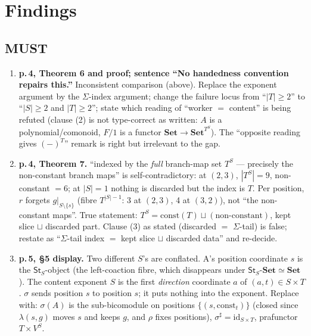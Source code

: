 \documentclass[11pt]{article}
\newcommand{\St}{\mathsf{St}}
\begin{document}
\section*{Findings}
\subsection*{MUST}
\begin{enumerate}[label=\textbf{M\arabic*.},leftmargin=*]
\item \textbf{p.\,4, Theorem 6 and proof; sentence ``No handedness convention repairs this.''}
  Inconsistent comparison (above). Replace the exponent argument by the $\Sigma$-index argument; change
  the failure locus from ``$|T|\ge2$'' to ``$|S|\ge2$ and $|T|\ge2$''; state which reading of
  ``worker $=$ content'' is being refuted (clause (2) is not type-correct as written: $A$ is a
  polynomial/comonoid, $F/1$ is a functor $\mathbf{Set}\to\mathbf{Set}^{T^S}$). The ``opposite reading
  gives $(-)^T$'' remark is right but irrelevant to the gap.
\item \textbf{p.\,4, Theorem 7.} ``indexed by the \emph{full} branch-map set $T^S$ --- precisely the
  non-constant branch maps'' is self-contradictory: at $(2,3)$, $|T^S|=9$, non-constant $=6$; at
  $|S|=1$ nothing is discarded but the index is $T$. Per position, $r$ forgets $g|_{S\setminus\{s\}}$
  (fibre $T^{|S|-1}$: 3 at $(2,3)$, 4 at $(3,2)$), not ``the non-constant maps''. True statement:
  $T^S=\mathrm{const}(T)\sqcup(\text{non-constant})$, kept slice $\sqcup$ discarded part. Clause (3)
  as stated (discarded $=$ $\Sigma$-tail) is false; restate as ``$\Sigma$-tail index $=$ kept slice $\sqcup$ discarded
  data'' and re-decide.
\item \textbf{p.\,5, \S5 display.} Two different $S$'s are conflated. A's position coordinate
  $s$ is the $\St_S$-object (the left-coaction fibre, which disappears under
  $\St_S\text{-}\mathbf{Set}\simeq\mathbf{Set}$). The content exponent $S$ is the first
  \emph{direction} coordinate $a$ of $(a,t)\in S\times T$. $\sigma$ sends position $s$ to position
  $s$; it puts nothing into the exponent. Replace with: $\sigma(A)$ is the sub-bicomodule on positions
  $\{(s,\mathrm{const}_t)\}$ (closed since $\lambda(s,g)$ moves $s$ and keeps $g$, and $\rho$ fixes
  positions), $\sigma^\sharp=\mathrm{id}_{S\times T}$, prafunctor $T\times V^S$.
\end{enumerate}
\end{document}
